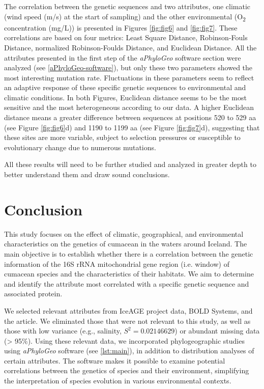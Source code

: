 The correlation between the genetic sequences and two attributes, one climatic (wind speed (m/s) at the start of sampling) and the other environmental (O\textsubscript{2} concentration (mg/L)) is presented in Figures \ref{fig:fig6} and \ref{fig:fig7}. These correlations are based on four metrics: Least Square Distance, Robinson-Fouls Distance, normalized Robinson-Foulds Distance, and Euclidean Distance. All the attributes presented in the first step of the \textit{aPhyloGeo} software section were analyzed (see \ref{aPhyloGeo-software}), but only these two parameters showed the most interesting mutation rate. Fluctuations in these parameters seem to reflect an adaptive response of these specific genetic sequences to environmental and climatic conditions. In both Figures, Euclidean distance seems to be the most sensitive and the most heterogeneous according to our data. A higher Euclidean distance means a greater difference between sequences at positions 520 to 529 aa (see Figure \ref{fig:fig6}d) and 1190 to 1199 aa (see Figure \ref{fig:fig7}d), suggesting that these sites are more variable, subject to selection pressures or susceptible to evolutionary change due to numerous mutations. 

All these results will need to be further studied and analyzed in greater depth to better understand them and draw sound conclusions.

\section{Conclusion}\label{conclusion}

This study focuses on the effect of climatic, geographical, and environmental characteristics on the genetics of cumacean in the waters around Iceland. The main objective is to establish whether there is a correlation between the genetic information of the 16S rRNA mitochondrial gene region (i.e. window) of cumacean species and the characteristics of their habitats. We aim to determine and identify the attribute most correlated with a specific genetic sequence and associated protein.

We selected relevant attributes from IceAGE project data, BOLD Systems, and the \citep{uhlir_adding_2021} article. We eliminated those that were not relevant to this study, as well as those with low variance (e.g., salinity, $S^2 = 0.02146629$) or abundant missing data (> 95\%). Using these relevant data, we incorporated phylogeographic studies using \textit{aPhyloGeo} software (see \autoref{lst:main}), in addition to distribution analyses of certain attributes. The software makes it possible to examine potential correlations between the genetics of species and their environment, simplifying the interpretation of species evolution in various environmental contexts.

